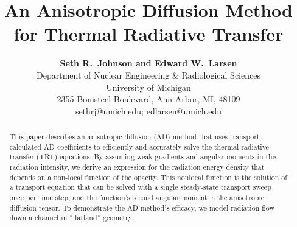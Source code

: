\documentclass[11pt,letter,twoside]{mc2011}
\begin{document}
\title{An Anisotropic Diffusion Method for Thermal Radiative
Transfer}

\author{
\textbf{Seth R.~Johnson and Edward W.~Larsen}\\
Department of Nuclear Engineering \& Radiological Sciences\\
University of Michigan \\
2355 Bonisteel Boulevard, Ann Arbor, MI, 48109\\
sethrj@umich.edu; edlarsen@umich.edu
}

\maketitle

\thispagestyle{empty}

\begin{abstract}
This paper describes an anisotropic diffusion (AD) method that uses
transport-calculated AD coefficients to efficiently and accurately solve the
thermal radiative transfer (TRT) equations. By assuming weak gradients and angular moments in the radiation
intensity, we derive an expression for the radiation energy density that
depends on a non-local function of the opacity. This nonlocal function is the
solution of a transport equation that can be solved with a single steady-state
transport sweep once per time step, and the function's second angular moment is
the anisotropic diffusion tensor.
To demonstrate the AD method's efficacy, we model radiation flow down a channel 
in ``flatland'' geometry. 


\end{abstract}

\newcommand\authorname{Seth~R.~Johnson and Edward~W.~Larsen}
\newcommand\shorttitlename{Anisotropic diffusion for TRT}


\end{document}
